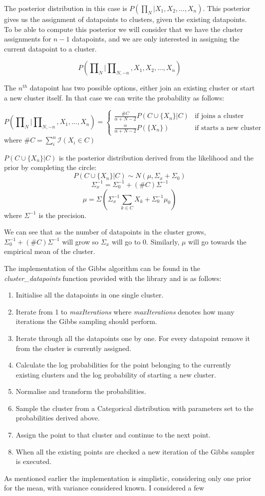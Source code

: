 \documentclass[12pt,a4paper]{article}
\begin{document}
The posterior distribution in this case is $P(\prod\nolimits_{N}|X_{1}, X_{2}, ..., X_{n})$. This posterior gives us the assignment of datapoints to clusters, given the existing datapoints. To be able to compute this posterior we will consider that we have the cluster assignments for $n-1$ datapoints, and we are only interested in assigning the current datapoint to a cluster. 

$$P(\prod\nolimits_{N}|\prod\nolimits_{N, -n}, X_{1}, X_{2}, ..., X_{n})$$

The $n^{th}$ datapoint has two possible options, either join an existing cluster or start a new cluster itself. In that case we can write the probability as follows: 

$$P(\prod\nolimits_{N}|\prod\nolimits_{N, -n}, X_{1}, ..., X_{n}) = \left \{
    \begin{array}{ll}
		\frac{\#C}{\alpha+ N - 2}P(C \cup \{X_{n}\}|C) & \mbox{if joins a cluster} \\
		\frac{\alpha}{\alpha+N-2}P(\{X_{n}\}) & \mbox{if starts a new cluster} 
	\end{array}
\right.$$
where $\#C = \sum_{i}^{n}\mathcal{I}(X_{i} \in C)$

$P(C \cup \{X_{n}\}|C)$ is the posterior distribution derived from the likelihood and the prior by completing the circle:
$$P(C \cup \{X_{n}\}|C) \sim N(\mu, \Sigma_{x} + \Sigma_{0})$$
$$\Sigma_{x}^{-1} = \Sigma_{0}^{-1} + (\#C)\Sigma^{-1}$$
$$\mu = \Sigma(\Sigma_{x}^{-1}\sum_{k \in C}X_{k} + \Sigma_{0}^{-1}\mu_{0})$$
where $\Sigma^{-1}$ is the precision.

We can see that as the number of datapoints in the cluster grows, $\Sigma_{0}^{-1} + (\#C)\Sigma^{-1}$ will grow so $\Sigma_{x}$ will go to 0. Similarly, $\mu$ will go towards the empirical mean of the cluster.

The implementation of the Gibbs algorithm can be found in the \textit{cluster\_datapoints} function provided with the library and is as follows:

\begin{enumerate}
    \item Initialise all the datapoints in one single cluster.
    \item Iterate from 1 to \textit{maxIterations} where \textit{maxIterations} denotes how many iterations the Gibbs sampling should perform. 
    \item Iterate through all the datapoints one by one. For every datapoint remove it from the cluster is currently assigned.
    \item Calculate the log probabilities for the point belonging to the currently existing clusters and the log probability of starting a new cluster.
    \item Normalise and transform the probabilities.
    \item Sample the cluster from a Categorical distribution with parameters set to the probabilities derived above.
    \item Assign the point to that cluster and continue to the next point.
    \item When all the existing points are checked a new iteration of the Gibbs sampler is executed. 
\end{enumerate}

As mentioned earlier the implementation is simplistic, considering only one prior for the mean, with variance considered known. I considered a few 
\end{document}
